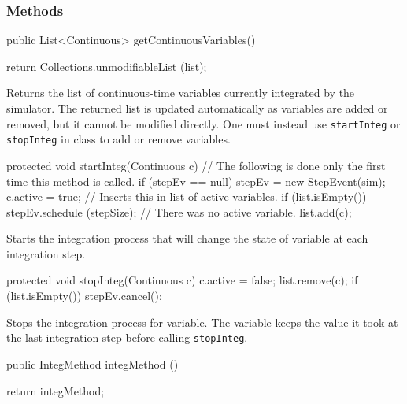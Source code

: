 \subsubsection* {Methods}
\begin{code}

   public List<Continuous> getContinuousVariables()\begin{hide} {
       return Collections.unmodifiableList (list);
   }\end{hide}
\end{code}
\begin{tabb}  Returns the list of continuous-time variables currently
  integrated by the simulator.
  The returned list is updated automatically as variables are added or removed, but it
  cannot be modified directly. One must instead use
  \texttt{startInteg} or \texttt{stopInteg} in class  to add
  or remove variables.
\end{tabb}
 \begin{hide} \begin{code}

   protected void startInteg(Continuous c) {
      // The following is done only the first time this method is called.
      if (stepEv == null) 
         stepEv = new StepEvent(sim);
      c.active = true;
      // Inserts this in list of active variables.
      if (list.isEmpty()) {
         stepEv.schedule (stepSize);
      }   // There was no active variable.
      list.add(c);
   }
\end{code}
 \begin{tabb}  Starts the integration process that will change the state of
   variable at each integration step.
 \end{tabb}
 \begin{code}

   protected void stopInteg(Continuous c) {
      c.active = false;
      list.remove(c);
      if (list.isEmpty()) stepEv.cancel();
   }
\end{code}
 \begin{tabb}  Stops the integration process for  variable.
  The variable keeps the value it took at the last integration step
  before calling \texttt{stopInteg}.
 \end{tabb}\end{hide}
 \begin{code}

   public IntegMethod integMethod ()\begin{hide} {
      return integMethod;
   }\end{hide}
\end{code}
